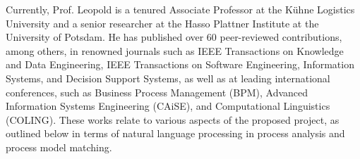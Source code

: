 
Currently, Prof. Leopold is a tenured Associate Professor at the Kühne Logistics University and a senior researcher at the Hasso Plattner Institute at the University of Potsdam. He has published over 60 peer-reviewed contributions, among others, in renowned journals such as IEEE Transactions on Knowledge and Data Engineering, IEEE Transactions on Software Engineering, Information Systems, and Decision Support Systems, as well as at leading international conferences, such as Business Process Management (BPM), Advanced Information Systems Engineering (CAiSE), and Computational Linguistics (COLING). These works relate to various aspects of the proposed project, as outlined below in terms of natural language processing in process analysis and process model matching.



